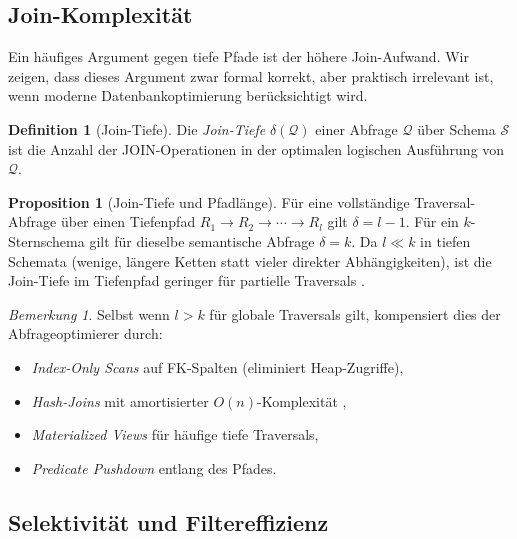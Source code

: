﻿\documentclass[a4paper,12pt]{report}
\theoremstyle{definition}
\newtheorem{definition}{Definition}[chapter]
\newtheorem{proposition}[theorem]{Proposition}
\theoremstyle{remark}
\newtheorem{remark}{Bemerkung}[chapter]
\begin{document}
\subsection{Join-Komplexität}

Ein häufiges Argument gegen tiefe Pfade ist der höhere Join-Aufwand.
Wir zeigen, dass dieses Argument zwar formal korrekt, aber praktisch
irrelevant ist, wenn moderne Datenbankoptimierung berücksichtigt wird.

\begin{definition}[Join-Tiefe]
Die \emph{Join-Tiefe} $\delta(\mathcal{Q})$ einer Abfrage $\mathcal{Q}$ über
Schema $\mathcal{S}$ ist die Anzahl der JOIN-Operationen in der optimalen
logischen Ausführung von $\mathcal{Q}$.
\end{definition}

\begin{proposition}[Join-Tiefe und Pfadlänge]
\label{prop:jointiefe}
Für eine vollständige Traversal-Abfrage über einen Tiefenpfad
$R_1 \to R_2 \to \cdots \to R_l$ gilt $\delta = l - 1$.
Für ein $k$-Sternschema gilt für dieselbe semantische Abfrage $\delta = k$.
Da $l \ll k$ in tiefen Schemata (wenige, längere Ketten statt vieler
direkter Abhängigkeiten), ist die Join-Tiefe im Tiefenpfad geringer
für partielle Traversals \cite{Ramakrishnan2003}.
\end{proposition}

\begin{remark}
Selbst wenn $l > k$ für globale Traversals gilt, kompensiert dies der
Abfrageoptimierer durch:
\begin{itemize}
  \item \emph{Index-Only Scans} auf FK-Spalten (eliminiert Heap-Zugriffe),
  \item \emph{Hash-Joins} mit amortisierter $O(n)$-Komplexität \cite{Graefe1993},
  \item \emph{Materialized Views} für häufige tiefe Traversals,
  \item \emph{Predicate Pushdown} entlang des Pfades.
\end{itemize}
\end{remark}

\subsection{Selektivität und Filtereffizienz}
\end{document}
